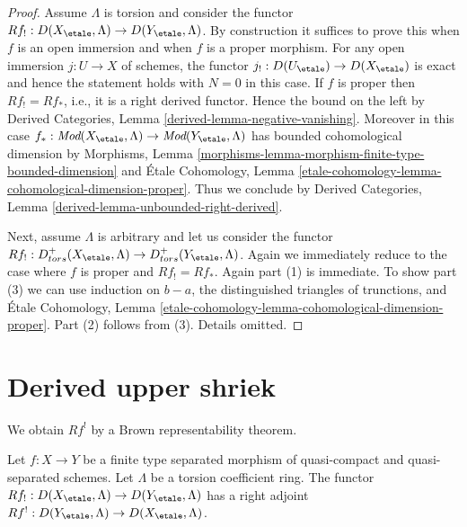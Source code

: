 \begin{proof}
Assume $\Lambda$ is torsion and consider the functor
$Rf_! : D(X_\etale, \Lambda) \to D(Y_\etale, \Lambda)$.
By construction it suffices to prove this when $f$ is an open immersion
and when $f$ is a proper morphism. For any open immersion $j : U \to X$
of schemes, the functor $j_! : D(U_\etale) \to D(X_\etale)$ is exact
and hence the statement holds with $N = 0$ in this case.
If $f$ is proper then $Rf_! = Rf_*$, i.e., it is a right derived
functor. Hence the bound on the left by
Derived Categories, Lemma \ref{derived-lemma-negative-vanishing}.
Moreover in this case $f_* : \textit{Mod}(X_\etale, \Lambda)
\to \textit{Mod}(Y_\etale, \Lambda)$ has bounded cohomological dimension by
Morphisms, Lemma \ref{morphisms-lemma-morphism-finite-type-bounded-dimension}
and \'Etale Cohomology, Lemma
\ref{etale-cohomology-lemma-cohomological-dimension-proper}.
Thus we conclude by
Derived Categories, Lemma \ref{derived-lemma-unbounded-right-derived}.

\medskip\noindent
Next, assume $\Lambda$ is arbitrary and let us consider the functor
$Rf_! : D^+_{tors}(X_\etale, \Lambda) \to D^+_{tors}(Y_\etale, \Lambda)$.
Again we immediately reduce to the case where $f$ is proper and
$Rf_! = Rf_*$. Again part (1) is immediate. To show part (3)
we can use induction on $b - a$, the distinguished
triangles of trunctions, and \'Etale Cohomology, Lemma
\ref{etale-cohomology-lemma-cohomological-dimension-proper}.
Part (2) follows from (3). Details omitted.
\end{proof}








\section{Derived upper shriek}
\label{section-derived-upper-shriek}

\noindent
We obtain $Rf^!$ by a Brown representability theorem.

\begin{lemma}
\label{lemma-upper-shriek-derived}
Let $f : X \to Y$ be a finite type separated morphism of quasi-compact
and quasi-separated schemes. Let $\Lambda$ be a torsion coefficient ring.
The functor
$Rf_! : D(X_\etale, \Lambda) \to D(Y_\etale, \Lambda)$
has a right adjoint
$Rf^! : D(Y_\etale, \Lambda) \to D(X_\etale, \Lambda)$.
\end{lemma}


